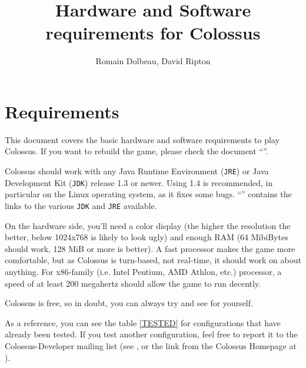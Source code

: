 \documentclass{article}
\begin{document}

\title{Hardware and Software requirements for Colossus}

\author{Romain Dolbeau, David Ripton}

\maketitle

\section{Requirements}

This document covers the basic hardware and software requirements to play Colossus. If you want to rebuild the game, please check the document ``''.

Colossus should work with any Java Runtime Environment (\texttt{JRE}) or Java Development Kit (\texttt{JDK}) release 1.3 or newer. Using 1.4 is recommended, in particular on the Linux operating system, as it fixes some bugs. ``'' contains the links to the various \texttt{JDK} and \texttt{JRE} available.

On the hardware side, you'll need a color display (the higher the resolution the better, below 1024x768 is likely to look ugly) and enough RAM (64 MibiBytes \cite{NIST-RCUU} should work, 128 MiB or more is better). A fast processor makes the game more comfortable, but as Colossus is turn-based, not real-time, it should work on about anything. For x86-family (i.e. Intel Pentium, AMD Athlon, etc.) processor, a speed of at least 200 megahertz should allow the game to run decently.

Colossus is free, so in doubt, you can always try and see for yourself.

As a reference, you can see the table \ref{TESTED} for configurations that have already been tested. If you test another configuration, feel free to report it to the Colossus-Developer mailing list (see , or the link from the Colossus Homepage at ).
\end{document}
